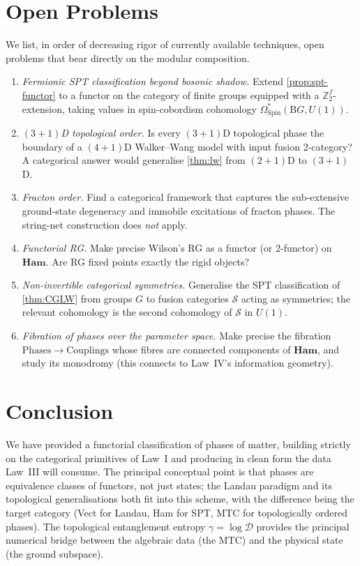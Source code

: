 \documentclass[12pt]{article}
\theoremstyle{plain}
\theoremstyle{definition}
\theoremstyle{remark}
\newcommand{\Ham}{\mathbf{Ham}}
\newcommand{\BG}{\mathrm{B}G}
\begin{document}
\section{Open Problems}
\label{sec:open}

We list, in order of decreasing rigor of currently available techniques, open problems
that bear directly on the modular composition.

\begin{enumerate}[label=O\arabic*.,leftmargin=2.5em]
  \item \emph{Fermionic SPT classification beyond bosonic shadow.} Extend
    \cref{prop:spt-functor} to a functor on the category of finite groups equipped with
    a $\mathbb{Z}_{2}^{f}$-extension, taking values in spin-cobordism cohomology
    $\Omega^{*}_{\mathrm{Spin}}(\BG,U(1))$.
  \item \emph{$(3{+}1)$D topological order.} Is every $(3{+}1)$D topological phase the
    boundary of a $(4{+}1)$D Walker--Wang model with input fusion 2-category? A
    categorical answer would generalise \cref{thm:lw} from $(2{+}1)$D to $(3{+}1)$D.
  \item \emph{Fracton order.} Find a categorical framework that captures the
    sub-extensive ground-state degeneracy and immobile excitations of fracton phases.
    The string-net construction does \emph{not} apply.
  \item \emph{Functorial RG.} Make precise Wilson's RG as a functor (or 2-functor) on
    $\Ham$. Are RG fixed points exactly the rigid objects?
  \item \emph{Non-invertible categorical symmetries.} Generalise the SPT classification
    of \cref{thm:CGLW} from groups $G$ to fusion categories $\mathcal{S}$ acting as
    symmetries; the relevant cohomology is the second cohomology of $\mathcal{S}$ in
    $U(1)$.
  \item \emph{Fibration of phases over the parameter space.} Make precise the
    fibration $\mathrm{Phases}\to\mathrm{Couplings}$ whose fibres are connected
    components of $\Ham$, and study its monodromy (this connects to Law~IV's
    information geometry).
\end{enumerate}

\section{Conclusion}
\label{sec:conclusion}

We have provided a functorial classification of phases of matter, building strictly on
the categorical primitives of Law~I and producing in clean form the data Law~III will
consume. The principal conceptual point is that phases are equivalence classes of
functors, not just states; the Landau paradigm and its topological generalisations both
fit into this scheme, with the difference being the target category (Vect for Landau,
Ham for SPT, MTC for topologically ordered phases). The topological entanglement entropy
$\gamma=\log\mathcal{D}$ provides the principal numerical bridge between the algebraic
data (the MTC) and the physical state (the ground subspace).
\end{document}

